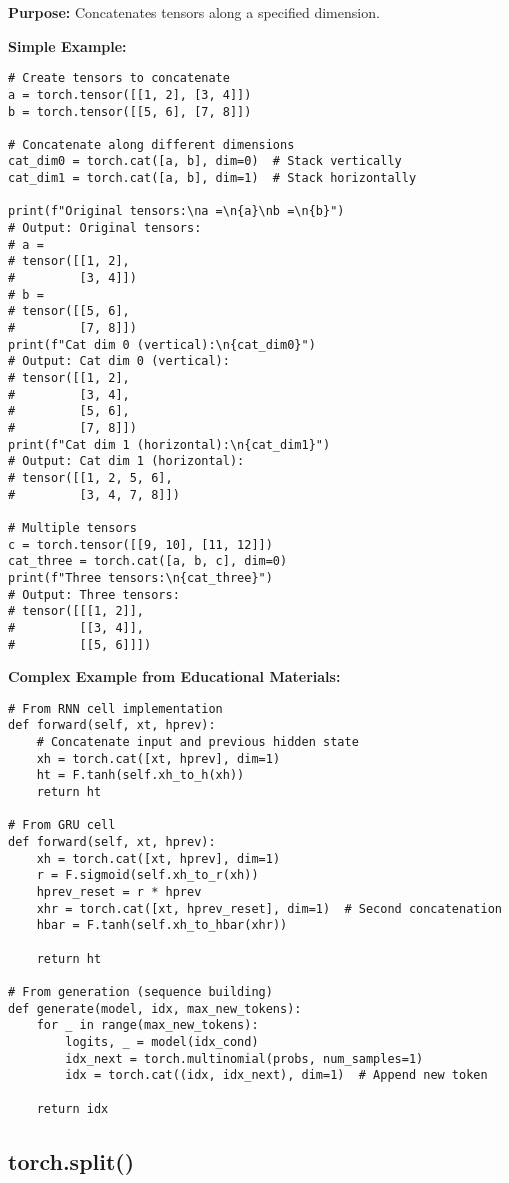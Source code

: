 \documentclass[11pt,a4paper]{book}
\begin{document}
\textbf{Purpose:} Concatenates tensors along a specified dimension.

\textbf{Simple Example:}
\begin{verbatim}
# Create tensors to concatenate
a = torch.tensor([[1, 2], [3, 4]])
b = torch.tensor([[5, 6], [7, 8]])

# Concatenate along different dimensions
cat_dim0 = torch.cat([a, b], dim=0)  # Stack vertically
cat_dim1 = torch.cat([a, b], dim=1)  # Stack horizontally

print(f"Original tensors:\na =\n{a}\nb =\n{b}")
# Output: Original tensors:
# a =
# tensor([[1, 2],
#         [3, 4]])
# b =
# tensor([[5, 6],
#         [7, 8]])
print(f"Cat dim 0 (vertical):\n{cat_dim0}")
# Output: Cat dim 0 (vertical):
# tensor([[1, 2],
#         [3, 4],
#         [5, 6],
#         [7, 8]])
print(f"Cat dim 1 (horizontal):\n{cat_dim1}")
# Output: Cat dim 1 (horizontal):
# tensor([[1, 2, 5, 6],
#         [3, 4, 7, 8]])

# Multiple tensors
c = torch.tensor([[9, 10], [11, 12]])
cat_three = torch.cat([a, b, c], dim=0)
print(f"Three tensors:\n{cat_three}")
# Output: Three tensors:
# tensor([[[1, 2]],
#         [[3, 4]],
#         [[5, 6]]])
\end{verbatim}

\textbf{Complex Example from Educational Materials:}
\begin{verbatim}
# From RNN cell implementation
def forward(self, xt, hprev):
    # Concatenate input and previous hidden state
    xh = torch.cat([xt, hprev], dim=1)
    ht = F.tanh(self.xh_to_h(xh))
    return ht

# From GRU cell
def forward(self, xt, hprev):
    xh = torch.cat([xt, hprev], dim=1)
    r = F.sigmoid(self.xh_to_r(xh))
    hprev_reset = r * hprev
    xhr = torch.cat([xt, hprev_reset], dim=1)  # Second concatenation
    hbar = F.tanh(self.xh_to_hbar(xhr))
    
    return ht

# From generation (sequence building)
def generate(model, idx, max_new_tokens):
    for _ in range(max_new_tokens):
        logits, _ = model(idx_cond)
        idx_next = torch.multinomial(probs, num_samples=1)
        idx = torch.cat((idx, idx_next), dim=1)  # Append new token
    
    return idx
\end{verbatim}

\subsection{torch.split()}
\end{document}
